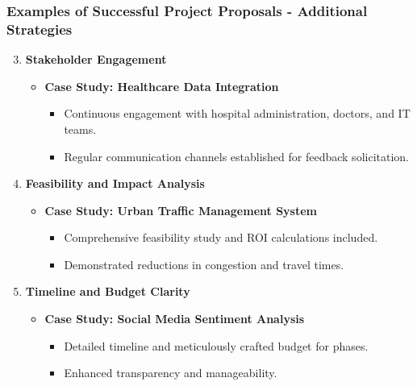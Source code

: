\documentclass[aspectratio=169]{beamer}
\begin{document}
\begin{frame}[fragile]
    \frametitle{Examples of Successful Project Proposals - Additional Strategies}
    \begin{enumerate}
        \setcounter{enumi}{2} %
        \item \textbf{Stakeholder Engagement}
        \begin{itemize}
            \item \textbf{Case Study: Healthcare Data Integration}
            \begin{itemize}
                \item Continuous engagement with hospital administration, doctors, and IT teams.
                \item Regular communication channels established for feedback solicitation.
            \end{itemize}
        \end{itemize}

        \item \textbf{Feasibility and Impact Analysis}
        \begin{itemize}
            \item \textbf{Case Study: Urban Traffic Management System}
            \begin{itemize}
                \item Comprehensive feasibility study and ROI calculations included.
                \item Demonstrated reductions in congestion and travel times.
            \end{itemize}
        \end{itemize}
        
        \item \textbf{Timeline and Budget Clarity}
        \begin{itemize}
            \item \textbf{Case Study: Social Media Sentiment Analysis}
            \begin{itemize}
                \item Detailed timeline and meticulously crafted budget for phases.
                \item Enhanced transparency and manageability.
            \end{itemize}
        \end{itemize}
    \end{enumerate}
\end{frame}
\end{document}
